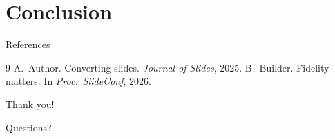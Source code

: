 \section{Conclusion}

\begin{frame}{References}
  \begin{thebibliography}{9}
     A.~Author. \newblock Converting slides. \newblock \emph{Journal of Slides}, 2025.
     B.~Builder. \newblock Fidelity matters. \newblock In \emph{Proc.\ SlideConf}, 2026.
  \end{thebibliography}
\end{frame}

\begin{frame}
  \centering
  {\Huge Thank you!}

  \vspace{1em}
  Questions?
\end{frame}


